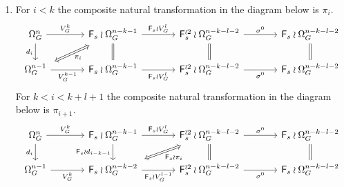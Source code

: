 \documentclass[a4paper,10pt]{article}%
\begin{document}
\begin{proposition}
\begin{enumerate}[label=(\alph*)]
\item
For $i<k$ the composite natural transformation in the diagram below is $\pi_i$.
\begin{equation}\label{INDPI1 EQ}
\begin{tikzcd}[row sep=1.7em,column sep = 3.5em]
	\Omega_{G}^{n} \ar{d}[swap]{d_{i}} \ar{r}{V_G^k} &
	|[alias=F1]|
	\Fin_s \wr \Omega_{G}^{n-k-1} \ar{r}{\Fin_s \wr V_{G}^l} 
	\ar[equal]{d} &
	\Fin_s^{\wr 2} \wr \Omega_G^{n-k-l-2} \ar[equal]{d} \ar{r}{\sigma^0} &
	\Fin_s \wr \Omega_G^{n-k-l-2} \ar[equal]{d}
\\
	|[alias=G2]|
	\Omega_{G}^{n-1} \ar{r}[swap]{V_G^{k-1}}&
	\Fin_s \wr \Omega_{G}^{n-k-1} \ar{r}[swap]{\Fin_s \wr V_{G}^{l}} &
	\Fin_s^{\wr 2} \wr  \Omega_G^{n-k-l-2} \ar{r}[swap]{\sigma^0} &
	\Fin_s \wr  \Omega_G^{n-k-l-2}
\arrow[Leftrightarrow, from=F1, to=G2,shorten >=0.15cm,shorten <=0.15cm,"\pi_{i}"]
\end{tikzcd}
\end{equation}
For $k< i < k+l+1$ the composite natural transformation in the diagram below is $\pi_{i+1}$.
\begin{equation}\label{INDPI2 EQ}
\begin{tikzcd}[row sep=1.7em,column sep = 3.5em]
	\Omega_{G}^{n} \ar{d}[swap]{d_{i}} \ar{r}{V_G^k} &
	\Fin_s \wr \Omega_{G}^{n-k-1} \ar{r}{\Fin_s \wr V_{G}^l} 
	\ar{d}[swap]{\Fin_s \wr d_{i-k-1}} &
	|[alias=F1]|
	\Fin_s^{\wr 2} \wr \Omega_G^{n-k-l-2} \ar[equal]{d} \ar{r}{\sigma^0} &
	\Fin_s \wr \Omega_G^{n-k-l-2} \ar[equal]{d}
\\
	\Omega_{G}^{n-1} \ar{r}[swap]{V_G^k}&
	|[alias=G2]|
	\Fin_s \wr \Omega_{G}^{n-k-2} \ar{r}[swap]{\Fin_s \wr V_{G}^{l-1}} &
	\Fin_s^{\wr 2} \wr  \Omega_G^{n-k-l-2} \ar{r}[swap]{\sigma^0} &
	\Fin_s \wr  \Omega_G^{n-k-l-2}
\arrow[Leftrightarrow, from=F1, to=G2,shorten >=0.15cm,shorten <=0.15cm,"\Fin_s \wr \pi_{i}"]
\end{tikzcd}
\end{equation}


\end{enumerate}
\end{proposition}
\end{document}
